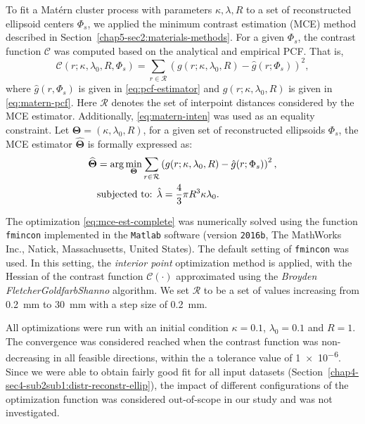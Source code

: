 \documentclass[journal]{IEEEtran}
\begin{document}
To fit a Mat\'ern cluster process with parameters $\kappa, \lambda, R$
to a set of reconstructed ellipsoid centers $\Phi_s$, we applied the
minimum contrast estimation (MCE) method described in
Section~\ref{chap5-sec2:materials-methods}. For a given $\Phi_s$, the
contrast function $\mathcal{C}$ was computed based on the analytical
and empirical PCF. That is,
\begin{equation}
  \label{eq:matern-contrast}
  \mathcal{C}(r; \kappa, \lambda_0, R, \Phi_s) =
  \sum_{r \in \mathcal{R}} (g(r; \kappa, \lambda_0, R) -
  \hat{g}(r; \Phi_s))^2,
\end{equation}
where $\hat{g}(r, \Phi_s)$ is given in \eqref{eq:pcf-estimator} and
$g(r; \kappa, \lambda_0, R)$ is given in \eqref{eq:matern-pcf}. Here
$\mathcal{R}$ denotes the set of interpoint distances considered by
the MCE estimator. Additionally, \eqref{eq:matern-inten} was used as
an equality constraint. Let
$\mathbf{\Theta} = \left( \kappa, \lambda_0, R \right)$, for a given
set of reconstructed ellipsoids $\Phi_s$, the MCE estimator
$\widehat{\mathbf{\Theta}}$ is formally expressed as:
\begin{equation}
  \label{eq:mce-est-complete}
  \begin{aligned}
    \widehat{\mathbf{\Theta}} & = \arg \min_{\mathbf{\Theta}} \sum_{r
      \in \mathcal{R}} \left( g(r; \kappa, \lambda_0, R)
      - \hat{g}(r; \Phi_s) \right)^2, \\
    & \textnormal{subjected to: } \hat{\lambda} = \frac{4}{3}\pi
    R^3\kappa \lambda_0.
  \end{aligned}
\end{equation}

The optimization \eqref{eq:mce-est-complete} was numerically solved
using the function \texttt{fmincon} implemented in the \texttt{Matlab}
software (version \texttt{2016b}, The MathWorks Inc., Natick,
Massachusetts, United States). The default setting of \texttt{fmincon}
was used. In this setting, the \textit{interior point} optimization
method is applied, with the Hessian of the contrast function
$\mathcal{C}(\cdot)$ approximated using the \textit{Broyden\textendash
  Fletcher\textendash Goldfarb\textendash Shanno} algorithm. We set
$\mathcal{R}$ to be a set of values increasing from \SI{0.2}{\mm} to
\SI{30}{\mm} with a step size of \SI{0.2}{\mm}.

All optimizations were run with an initial condition $\kappa = 0.1$,
$\lambda_0 = 0.1$ and $R = 1$. The convergence was considered reached
when the contrast function was non-decreasing in all feasible
directions, within the a tolerance value of \num{1e-6}. Since we were
able to obtain fairly good fit for all input datasets
(Section~\ref{chap4-sec4-sub2sub1:distr-reconstr-ellip}), the impact
of different configurations of the optimization function was
considered out-of-scope in our study and was not investigated.
\end{document}
